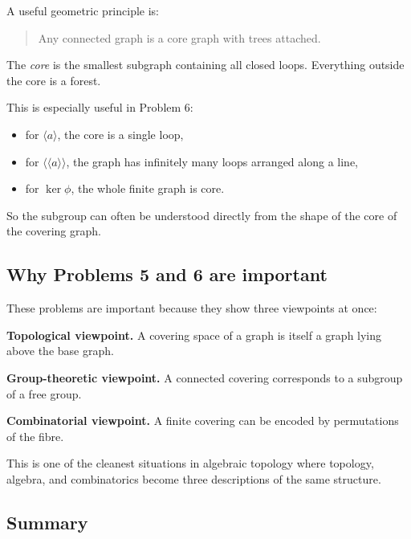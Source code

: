 \documentclass[12pt,a4paper]{article}
\theoremstyle{notespace}
\begin{document}
A useful geometric principle is:
\begin{quote}
	Any connected graph is a core graph with trees attached.
\end{quote}

The \emph{core} is the smallest subgraph containing all closed loops. Everything outside the core is a forest.

This is especially useful in Problem 6:
\begin{itemize}
	\item for \(\langle a\rangle\), the core is a single loop,
	\item for \(\langle\!\langle a\rangle\!\rangle\), the graph has infinitely many loops arranged along a line,
	\item for \(\ker\phi\), the whole finite graph is core.
\end{itemize}

So the subgroup can often be understood directly from the shape of the core of the covering graph.

\bigskip

\subsection{ Why Problems 5 and 6 are important}

These problems are important because they show three viewpoints at once:

\medskip

\textbf{Topological viewpoint.}
A covering space of a graph is itself a graph lying above the base graph.

\medskip

\textbf{Group-theoretic viewpoint.}
A connected covering corresponds to a subgroup of a free group.

\medskip

\textbf{Combinatorial viewpoint.}
A finite covering can be encoded by permutations of the fibre.

\medskip

This is one of the cleanest situations in algebraic topology where topology, algebra, and combinatorics become three descriptions of the same structure.

\bigskip

\subsection{Summary}
\end{document}
